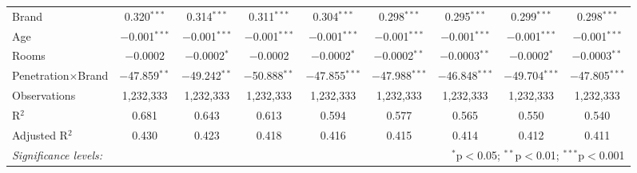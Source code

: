 \begin{table}[!htbp]
\begin{sideways}
{\begin{tabular}{@{\extracolsep{5pt}}lcccccccc}
  Brand & 0.320$^{***}$ & 0.314$^{***}$ & 0.311$^{***}$ & 0.304$^{***}$ & 0.298$^{***}$ & 0.295$^{***}$ & 0.299$^{***}$ & 0.298$^{***}$ \\   
  Age & $-$0.001$^{***}$ & $-$0.001$^{***}$ & $-$0.001$^{***}$ & $-$0.001$^{***}$ & $-$0.001$^{***}$ & $-$0.001$^{***}$ & $-$0.001$^{***}$ & $-$0.001$^{***}$ \\ 
  Rooms & $-$0.0002 & $-$0.0002$^{*}$ & $-$0.0002 & $-$0.0002$^{*}$ & $-$0.0002$^{**}$ & $-$0.0003$^{**}$ & $-$0.0002$^{*}$ & $-$0.0003$^{**}$ \\  
  Penetration$\times$Brand & $-$47.859$^{**}$ & $-$49.242$^{**}$ & $-$50.888$^{**}$ & $-$47.855$^{***}$ & $-$47.988$^{***}$ & $-$46.848$^{***}$ & $-$49.704$^{***}$ & $-$47.805$^{***}$ \\
 \hline
Observations & 1,232,333 & 1,232,333 & 1,232,333 & 1,232,333 & 1,232,333 & 1,232,333 & 1,232,333 & 1,232,333 \\ 
R$^{2}$ & 0.681 & 0.643 & 0.613 & 0.594 & 0.577 & 0.565 & 0.550 & 0.540 \\ 
Adjusted R$^{2}$ & 0.430 & 0.423 & 0.418 & 0.416 & 0.415 & 0.414 & 0.412 & 0.411 \\ 
\hline 

\textit{Significance levels:}  & \multicolumn{8}{r}{$^{*}$p$<$0.05; $^{**}$p$<$0.01; $^{***}$p$<$0.001} \\
\end{tabular} 
} \end{sideways}
\end{table} 
